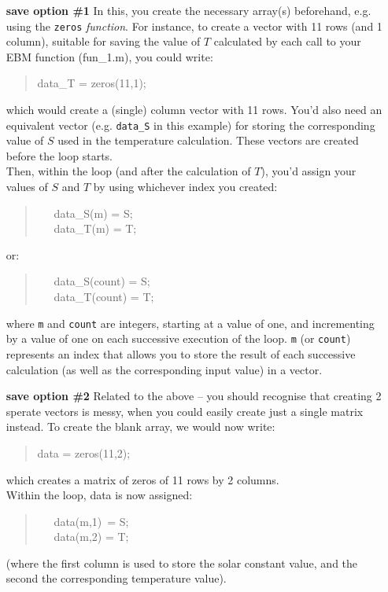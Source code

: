 \documentclass{tufte-book} %
\newenvironment{docspec}{\begin{quotation}\ttfamily\parskip0pt\parindent0pt\ignorespaces}{\end{quotation}}
\begin{document}
\begin{enumerate}
\setlength{\itemindent}{.65in}

\item [\textbf{save option \#1}] In this, you create the necessary array(s) beforehand, e.g. using the \texttt{zeros} \textit{function}. For instance, to create a vector with 11 rows (and 1 column), suitable for saving the value of \(T\) calculated by each call to your EBM function (\textsf{fun\_1.m}), you could write:
\begin{docspec}
data\_T = zeros(11,1);
\end{docspec}
which would create a (single) column vector with 11 rows. You'd also need an equivalent vector (e.g. \texttt{data\_S} in this example) for storing the corresponding value of \(S\) used in the temperature calculation. These vectors are created before the loop starts.
\\Then, within the loop (and after the calculation of \(T\)), you'd assign your values of \(S\) and \(T\) by using whichever index you created:
\begin{docspec}
\ \ \ data\_S(m) = S;
\\ \ \ \ data\_T(m) = T;
\end{docspec}
or:
\begin{docspec}
\ \ \ data\_S(count) = S;
\\ \ \ \ data\_T(count) = T;
\end{docspec}
where \texttt{m} and \texttt{count} are integers, starting at a value of one, and incrementing by a value of one on each successive execution of the loop. \texttt{m} (or \texttt{count}) represents an index that allows you to store the result of each successive calculation  (as well as the corresponding input value) in a vector.

\item [\textbf{save option \#2}] Related to the above -- you should recognise that creating 2 sperate vectors is messy, when you could easily create just a single matrix instead. To create the blank array, we would now write:
\begin{docspec}
data = zeros(11,2);
\end{docspec}
which creates a matrix of zeros of 11 rows by 2 columns.
\\\noindent Within the loop, data is now assigned:
\begin{docspec}
\ \ \ data(m,1)\ = S;
\\ \ \ \ data(m,2) = T;
\end{docspec}
(where the first column is used to store the solar constant value, and the second the corresponding temperature value).


\end{enumerate}
\end{document}
